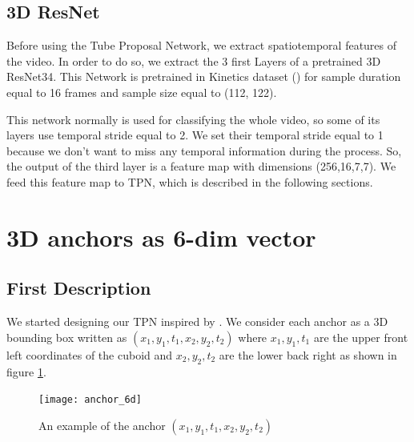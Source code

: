 \subsection{3D ResNet}
Before using the Tube Proposal Network, we extract spatiotemporal features of the video. In order to do so, we extract the 3 first Layers of a
pretrained 3D ResNet34. This Network is pretrained in Kinetics dataset (\cite{DBLP:journals/corr/KayCSZHVVGBNSZ17}) for sample duration
equal to 16  frames and sample size equal to (112, 122). \par
This network normally is used for classifying the whole video, so some of its layers use temporal stride equal to 2.
We set their temporal stride equal to 1 because we don't want to miss any temporal information during the process.
So, the output of the third layer is a feature map with dimensions (256,16,7,7). We feed this feature map to TPN, which is described
in the following sections.

\section{ 3D anchors as 6-dim vector}
\subsection{First Description}
We started designing our TPN inspired by \cite{DBLP:journals/corr/HouCS17}. We consider each anchor as a 3D bounding box written as
$(x_1, y_1, t_1, x_2, y_2, t_2)$ where $x_1, y_1, t_1$
are the upper front left coordinates of the cuboid and $x_2, y_2, t_2$ are the lower back right as shown in figure \ref{fig:anchor_6d}.
\begin{figure}[h]
  \centering
  \texttt{[image: anchor\_6d]}
  \caption{An example of the anchor $(x_1,y_1,t_1,x_2,y_2,t_2)$}
  \label{fig:anchor_6d}
\end{figure}

